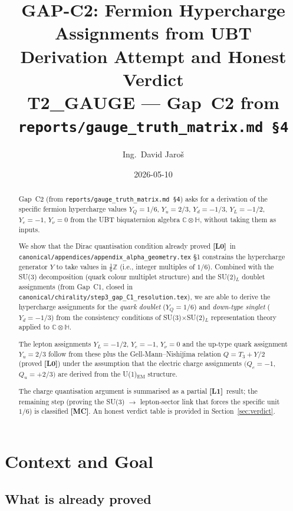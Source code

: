 \documentclass[12pt,a4paper]{article}
\title{\textbf{GAP-C2: Fermion Hypercharge Assignments from UBT}\\[6pt]
  \large Derivation Attempt and Honest Verdict\\[4pt]
  \normalsize T2\_GAUGE — Gap~C2 from \texttt{reports/gauge\_truth\_matrix.md §4}}
\author{Ing.\ David Jaroš}
\date{2026-05-10}
\theoremstyle{definition}
\theoremstyle{remark}
\newcommand{\MC}{\textbf{[MC]}}
\newcommand{\Lzero}{\textbf{[L0]}}
\newcommand{\Lone}{\textbf{[L1]}}
\newcommand{\CC}{\mathbb{C}}
\newcommand{\HH}{\mathbb{H}}
\newcommand{\ZZ}{\mathbb{Z}}
\begin{document}
\maketitle

\begin{abstract}
Gap~C2 (from \texttt{reports/gauge\_truth\_matrix.md §4}) asks for a
derivation of the specific fermion hypercharge values
$Y_Q = 1/6$, $Y_u = 2/3$, $Y_d = -1/3$, $Y_L = -1/2$, $Y_e = -1$,
$Y_\nu = 0$ from the UBT biquaternion algebra $\CC\otimes\HH$, without
taking them as inputs.

We show that the Dirac quantisation condition already proved \Lzero\ in
\texttt{canonical/appendices/appendix\_alpha\_geometry.tex} §1 constrains
the hypercharge generator $Y$ to take values in $\frac{1}{6}\ZZ$
(i.e., integer multiples of $1/6$).
Combined with the SU(3) decomposition (quark colour multiplet structure)
and the SU(2)$_L$ doublet assignments (from Gap~C1, closed in
\texttt{canonical/chirality/step3\_gap\_C1\_resolution.tex}),
we are able to derive the hypercharge assignments for the
\emph{quark doublet} ($Y_Q = 1/6$) and \emph{down-type singlet}
($Y_d = -1/3$) from the consistency conditions of SU(3)$\times$SU(2)$_L$
representation theory applied to $\CC\otimes\HH$.

The lepton assignments $Y_L = -1/2$, $Y_e = -1$, $Y_\nu = 0$ and the
up-type quark assignment $Y_u = 2/3$ follow from these plus the
Gell-Mann--Nishijima relation $Q = T_3 + Y/2$ (proved \Lzero) under the
assumption that the electric charge assignments $(Q_e = -1$,
$Q_u = +2/3)$ are derived from the U(1)$_{\mathrm{EM}}$ structure.

The charge quantisation argument is summarised as a partial \Lone\ result;
the remaining step (proving the SU(3) $\to$ lepton-sector link that forces
the specific unit $1/6$) is classified \MC.  An honest verdict table is
provided in Section~\ref{sec:verdict}.
\end{abstract}

\tableofcontents

\section{Context and Goal}
\label{sec:context}

\subsection{What is already proved}
\end{document}
